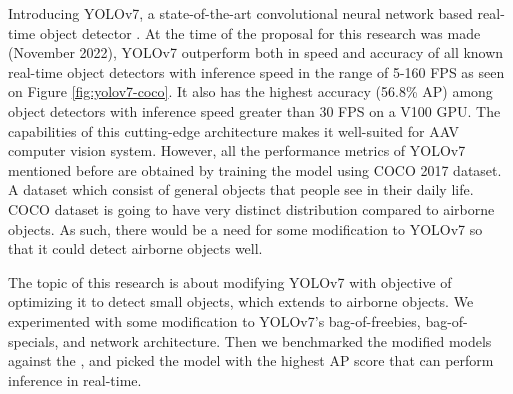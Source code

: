     Introducing YOLOv7, a state-of-the-art convolutional neural network based real-time object detector \parencite{yolov7}.
    At the time of the proposal for this research was made (November 2022),
    YOLOv7 outperform both in speed and accuracy of all known real-time object detectors 
    with inference speed in the range of 5-160 FPS as seen on Figure \ref{fig:yolov7-coco}. It also has the highest accuracy (56.8\% AP) among
    object detectors with inference speed greater than 30 FPS on a V100 GPU. The capabilities of this cutting-edge architecture
    makes it well-suited for AAV computer vision system. However, all the performance metrics of YOLOv7
    mentioned before are obtained by training the model using COCO 2017 dataset. A dataset which 
    consist of general objects that people see in their daily life. COCO dataset is going to have
    very distinct distribution compared to airborne objects. As such, there would be a need for
    some modification to YOLOv7 so that it could detect airborne objects well.

    The topic of this research is about modifying YOLOv7 with objective of optimizing it to detect
    small objects, which extends to airborne objects. We experimented with some modification to 
    YOLOv7's bag-of-freebies, bag-of-specials, and network architecture. Then we benchmarked the
    modified models against the \textcite{aot_dataset}, and picked the model with the highest AP score
    that can perform inference in real-time.





